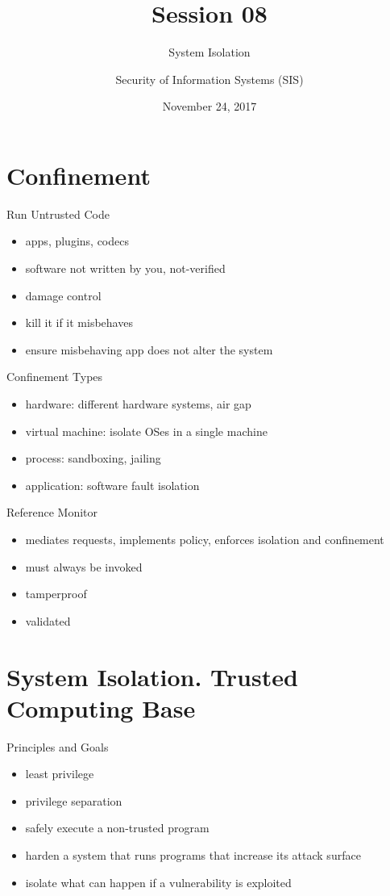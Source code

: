 \documentclass{curs}
\title[Session 08]{Session 08}
\subtitle{System Isolation}
\author{Security of Information Systems (SIS)}
\date{November 24, 2017}
\begin{document}
\frame{\titlepage}

\section{Confinement}

\begin{frame}{Run Untrusted Code}
  \begin{itemize}
    \item apps, plugins, codecs
    \item software not written by you, not-verified
    \item damage control
    \item kill it if it misbehaves
    \item ensure misbehaving app does not alter the system
  \end{itemize}
\end{frame}

\begin{frame}{Confinement Types}
  \begin{itemize}
    \item hardware: different hardware systems, air gap
    \item virtual machine: isolate OSes in a single machine
    \item process: sandboxing, jailing
    \item application: software fault isolation
  \end{itemize}
\end{frame}

\begin{frame}{Reference Monitor}
  \begin{itemize}
    \item mediates requests, implements policy, enforces isolation and confinement
    \item must always be invoked
    \item tamperproof
    \item validated
  \end{itemize}
\end{frame}

\section{System Isolation. Trusted Computing Base}

\begin{frame}{Principles and Goals}
  \begin{itemize}
    \item least privilege
    \item privilege separation
    \item safely execute a non-trusted program
    \item harden a system that runs programs that increase its attack surface
    \item isolate what can happen if a vulnerability is exploited
  \end{itemize}
\end{frame}
\end{document}
